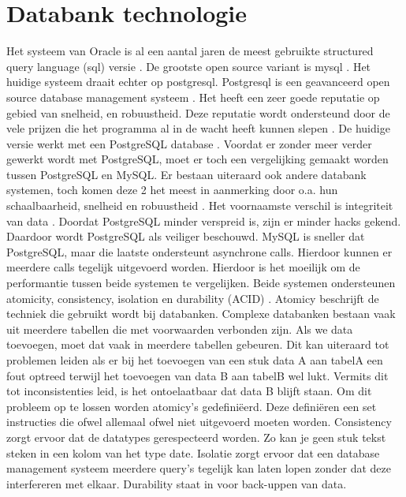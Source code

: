 \section{Databank technologie}
\npar
Het systeem van Oracle is al een aantal jaren de meest gebruikte structured query language (sql)  versie \citep{oracle-clear-leader}. De grootste open source variant is mysql \citep{mysql-market-share}. Het huidige systeem draait echter op postgresql. Postgresql is een geavanceerd open source database management systeem \citep{psql-about}. Het heeft een zeer goede reputatie op gebied van snelheid, en robuustheid. Deze reputatie wordt ondersteund door de vele prijzen die het programma al in de wacht heeft kunnen slepen \citep{psql-awards}. De huidige versie werkt met een PostgreSQL database \citep{FED4FIRE-doc}.
\npar
Voordat er zonder meer verder gewerkt wordt met PostgreSQL, moet er toch een vergelijking gemaakt worden tussen PostgreSQL en MySQL. Er bestaan uiteraard ook andere databank systemen, toch komen deze 2 het meest in aanmerking door o.a. hun schaalbaarheid, snelheid en robuustheid \citep{database-comparison}. 
\npar
Het voornaamste verschil is integriteit van data \citep{psql-vs-mysql}. Doordat PostgreSQL minder verspreid is, zijn er minder hacks gekend. Daardoor wordt PostgreSQL als veiliger beschouwd. MySQL is sneller dat PostgreSQL, maar die laatste ondersteunt asynchrone calls. Hierdoor kunnen er meerdere calls tegelijk uitgevoerd worden. Hierdoor is het moeilijk om de performantie tussen beide systemen te vergelijken.
\npar
Beide systemen ondersteunen atomicity, consistency, isolation en durability (ACID)\citep{psql-transactions} \citep{mysql-acid}. Atomicy beschrijft de  techniek die gebruikt wordt bij databanken. Complexe databanken bestaan vaak uit meerdere tabellen die met voorwaarden verbonden zijn. Als we data toevoegen, moet dat vaak in meerdere tabellen gebeuren. Dit kan uiteraard tot problemen leiden als er bij het toevoegen van een stuk data A aan tabelA een fout optreed terwijl het toevoegen van data B aan tabelB wel lukt. Vermits dit tot inconsistenties leid, is het ontoelaatbaar dat data B blijft staan. Om dit probleem op te lossen worden atomicy's gedefini\"eerd. Deze defini\"eren een set instructies die ofwel allemaal ofwel niet uitgevoerd moeten worden.
\npar
Consistency zorgt ervoor dat de datatypes gerespecteerd worden. Zo kan je geen stuk tekst steken in een kolom van het type date. Isolatie zorgt ervoor dat een database management systeem meerdere query's tegelijk kan laten lopen zonder dat deze interfereren met elkaar. Durability staat in voor back-uppen van data.

